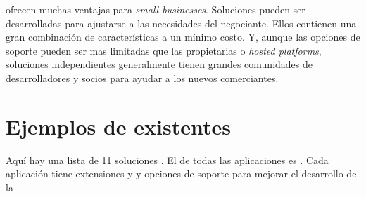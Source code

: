 

\opensource \ecommerce \shoppingcarts ofrecen muchas ventajas para \textit{small businesses}. Soluciones \opensource pueden ser desarrolladas para ajustarse a las necesidades del negociante. Ellos contienen una gran combinación de características a un mínimo costo. Y, aunque las opciones de soporte pueden ser mas limitadas que las propietarias o \textit{hosted platforms}, soluciones independientes \opensource generalmente tienen grandes comunidades de desarrolladores y socios para ayudar a los nuevos comerciantes.

\section{Ejemplos de \frameworks existentes}

Aquí hay una lista de 11 soluciones \ecommerce \opensource. El \core de todas las aplicaciones es \free. Cada aplicación tiene extensiones \free y \premium y opciones de soporte para mejorar el desarrollo de la \store.

